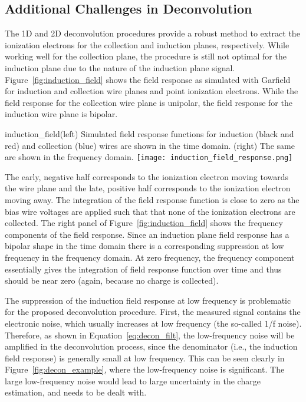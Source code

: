 
\subsection{Additional Challenges in Deconvolution}


The 1D and 2D deconvolution procedures provide a robust method to extract the ionization
electrons for the collection and induction planes, respectively. 
%
While working well for the collection plane, the procedure is still not optimal 
for the induction plane due to the nature of the induction plane signal. 
Figure~\ref{fig:induction_field} shows the field response as simulated with Garfield~\cite{garfield}
for induction and collection wire planes and point ionization
electrons. While the field response for the collection wire plane is unipolar, the field 
response for the induction wire plane is bipolar. 
%
\begin{cdrfigure}{induction_field}{(left) Simulated field response functions for induction (black and red) and 
collection (blue) wires are shown in the time domain. (right) The same are shown in 
the frequency domain.}
\texttt{[image: induction\_field\_response.png]}
\end{cdrfigure}
%
The early, negative half corresponds to the ionization electron moving
towards the wire plane and the late, positive half corresponds
to the ionization electron moving away.
%
The integration of the field response function is close to zero
as the bias wire voltages are applied such that that none of the ionization electrons are
collected. The right panel of Figure~\ref{fig:induction_field} shows the 
frequency components of the field response. 
%
Since an induction plane field response has a bipolar shape in the time domain 
there is a corresponding suppression at low frequency in the frequency 
domain. At zero frequency, the frequency component essentially gives the 
integration of field response function over time and thus should be near 
zero (again, because no charge is collected).


The suppression of the induction field response at low frequency is problematic for the
proposed deconvolution procedure. First,  the measured signal contains the electronic noise, 
which usually increases at low frequency (the so-called 1/f noise). Therefore, as shown in 
Equation~\eqref{eq:decon_filt}, the low-frequency noise will be amplified in the deconvolution 
process, since the denominator (i.e., the induction field response) is generally small at 
low frequency. This can be seen clearly in Figure~\ref{fig:decon_example}, where the low-frequency noise
is significant. The large low-frequency noise would lead to large uncertainty 
in the charge estimation, and needs to be dealt with.  

